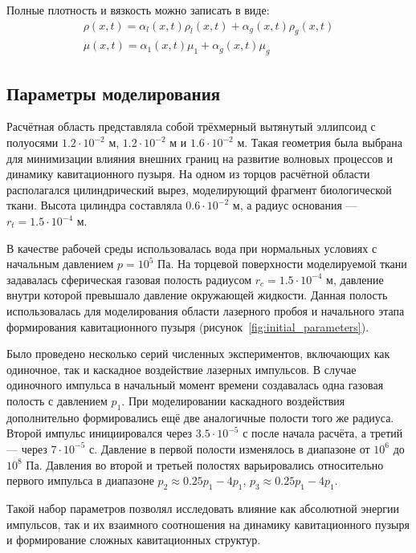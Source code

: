 Полные плотность и вязкость можно записать в виде:
\begin{gather}
    \rho  (x,t)=  \alpha _ {l}  (x,t)  \rho _ {l}  (x,t)+  \alpha _ {g}  (x,t)  \rho _ {g}  (x,t) \\
    \mu  (x,t)=  \alpha _ {1}  (x,t)  \mu _ {1}  +  \alpha _ {g}  (x,t)  \mu _ {g}
\end{gather}

\vspace{0.5\baselineskip}
\subsection{Параметры моделирования}
\vspace{0.5\baselineskip}

Расчётная область представляла собой трёхмерный вытянутый эллипсоид с полуосями $1.2 \cdot 10^{-2}$ м, $1.2 \cdot 10^{-2}$ м и $1.6 \cdot 10^{-2}$ м. Такая геометрия была выбрана для минимизации влияния внешних границ на развитие волновых процессов и динамику кавитационного пузыря. На одном из торцов расчётной области располагался цилиндрический вырез, моделирующий фрагмент биологической ткани. Высота цилиндра составляла $0.6 \cdot 10^{-2}$ м, а радиус основания — $r_t = 1.5 \cdot 10^{-4}$ м.

В качестве рабочей среды использовалась вода при нормальных условиях с начальным давлением $p=10^5$ Па. На торцевой поверхности моделируемой ткани задавалась сферическая газовая полость радиусом $r_c = 1.5 \cdot 10^{-4}$ м, давление внутри которой превышало давление окружающей жидкости. Данная полость использовалась для моделирования области лазерного пробоя и начального этапа формирования кавитационного пузыря (рисунок~\ref{fig:initial_parameters}).

Было проведено несколько серий численных экспериментов, включающих как одиночное, так и каскадное воздействие лазерных импульсов. В случае одиночного импульса в начальный момент времени создавалась одна газовая полость с давлением $p_1$. При моделировании каскадного воздействия дополнительно формировались ещё две аналогичные полости того же радиуса. Второй импульс инициировался через $3.5\cdot10^{-5}$ с после начала расчёта, а третий — через $7\cdot10^{-5}$ с. Давление в первой полости изменялось в диапазоне от $10^6$ до $10^8$ Па. Давления во второй и третьей полостях варьировались относительно первого импульса в диапазоне $p_2 \approx 0.25 p_1 - 4p_1$, $p_3 \approx 0.25 p_1 - 4p_1$.

Такой набор параметров позволял исследовать влияние как абсолютной энергии импульсов, так и их взаимного соотношения на динамику кавитационного пузыря и формирование сложных кавитационных структур.

